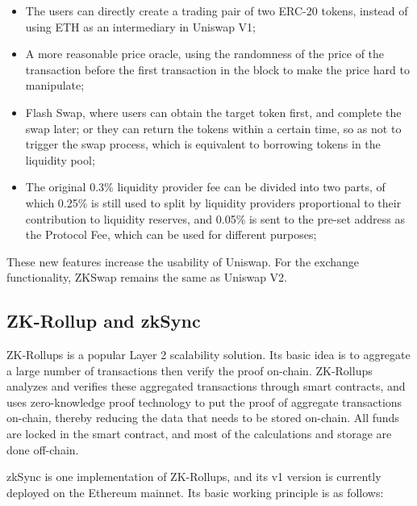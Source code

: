 \documentclass[]{template/llncs}
\begin{document}
\begin{itemize}
	\item The users can directly create a trading pair of two ERC-20 tokens, instead of using ETH as an intermediary in Uniswap V1;
	\item A more reasonable price oracle, using the randomness of the price of the transaction before the first transaction in the block to make the price hard to manipulate; 
	\item Flash Swap, where users can obtain the target token first, and complete the swap later; or they can return the tokens within a certain time, so as not to trigger the swap process, which is equivalent to borrowing tokens in the liquidity pool;
	\item The original 0.3\% liquidity provider fee can be divided into two parts, of which 0.25\% is still used to split by liquidity providers proportional to their contribution to liquidity reserves, and 0.05\% is sent to the pre-set address as the Protocol Fee, which can be used for different purposes;

\end{itemize}

These new features increase the usability of Uniswap. For the exchange functionality, ZKSwap remains the same as Uniswap V2.

\subsection{ZK-Rollup and zkSync}
ZK-Rollups is a popular Layer 2 scalability solution. Its basic idea is to aggregate a large number of transactions then verify the proof on-chain. ZK-Rollups analyzes and verifies these aggregated transactions through smart contracts, and uses zero-knowledge proof technology to put the proof of aggregate transactions on-chain, thereby reducing the data that needs to be stored on-chain. All funds are locked in the smart contract, and most of the calculations and storage are done off-chain.

zkSync\cite{zksync} is one implementation of ZK-Rollups, and its v1 version is currently deployed on the Ethereum mainnet. Its basic working principle is as follows:
\end{document}

